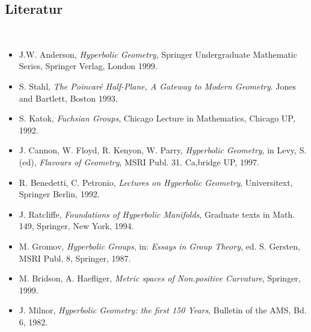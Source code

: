 \documentclass[11pt]{book}
\numberwithin{dummy}{section}
\theoremstyle{nonumberbreak}
\renewcommand*\thechapter{\arabic{chapter}}
\renewcommand{\chaptermark}[1]{ 
  \markboth{ 
     \MakeUppercase{\thechapter \quad #1} 
  }{} 
}
\renewcommand{\sectionmark}[1]{ 
  \markright{ 
     \MakeUppercase{\thesection \quad #1} 
  } 
}
\begin{document}
\begin{spacing}{1.4}


\renewcommand{\chaptermark}[1]{ 
  \markboth{ 
     \MakeUppercase{#1} 
  }{} 
} 
\renewcommand{\sectionmark}[1]{ 
  \markright{ 
     \MakeUppercase{\hspace{-4pt}#1} 
  } 
}




\chapter{Literatur}


\thispagestyle{empty}


\textrm{ }\\[55pt]


\begin{itemize}
\item J.W. Anderson, \textit{Hyperbolic Geometry}, Springer Undergraduate Mathematic Series, Springer Verlag, London 1999.
\item S. Stahl, \textit{The Poincaré Half-Plane, A Gateway to Modern Geometry}. Jones and Bartlett, Boston 1993.
\item S. Katok, \textit{Fuchsian Groups}, Chicago Lecture in Mathematics, Chicago UP, 1992.
\item J. Cannon, W. Floyd, R. Kenyon, W. Parry, \textit{Hyperbolic Geometry}, in Levy, S. (ed), \textit{Flavours of Geometry}, MSRI Publ. 31. Ca,bridge UP, 1997.
\item R. Benedetti, C. Petronio, \textit{Lectures on Hyperbolic Geometry}, Universitext, Springer Berlin, 1992.
\item J. Ratcliffe, \textit{Foundations of Hyperbolic Manifolds}, Graduate texts in Math. 149, Springer, New York, 1994.
\item M. Gromov, \textit{Hyperbolic Groups}, in: \textit{Essays in Group Theory}, ed. S. Gersten, MSRI Publ. 8, Springer, 1987.
\item M. Bridson, A. Haefliger, \textit{Metric spaces of Non.positive Curvature}, Springer, 1999.
\item J. Milnor, \textit{Hyperbolic Geometry: the first 150 Years}, Bulletin of the AMS, Bd. 6, 1982.



\end{itemize}




\end{spacing}
\end{document}
